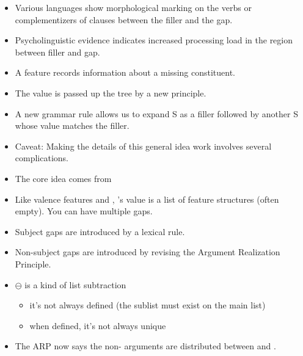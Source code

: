 \documentclass[a4paper,landscape,headrule,footrule]{foils}
\begin{document}





\begin{itemize}
\item Various languages show morphological marking
on the verbs or complementizers of clauses
between the filler and the gap.
\item Psycholinguistic evidence indicates increased
processing load in the region between filler and
gap.
\end{itemize}

\begin{itemize}
\item A feature  records information about a
missing constituent.
\item The  value is passed up the tree by a new
principle.
\item A new grammar rule allows us to expand S as a filler
followed by another S whose  value
matches the filler.
\item Caveat: Making the details of this general
idea work involves several complications.
\item The core idea comes from \citet{Gazdar:1981} 
\end{itemize}



\begin{itemize}
\item Like valence features and , ’s
value is a list of feature structures (often
empty).  You can have multiple gaps.
\item Subject gaps are introduced by a lexical rule.
\item Non-subject gaps are introduced by revising
the Argument Realization Principle.
\end{itemize}


\begin{itemize}
\item $\ominus$ is a kind of list subtraction 
  \begin{itemize}
  \item it's not always defined (the sublist must exist on the main list)
  \item when defined, it's not always unique 
  \end{itemize}
\item The ARP now says the non- arguments are
distributed between  and .
\end{itemize}
\end{document}
